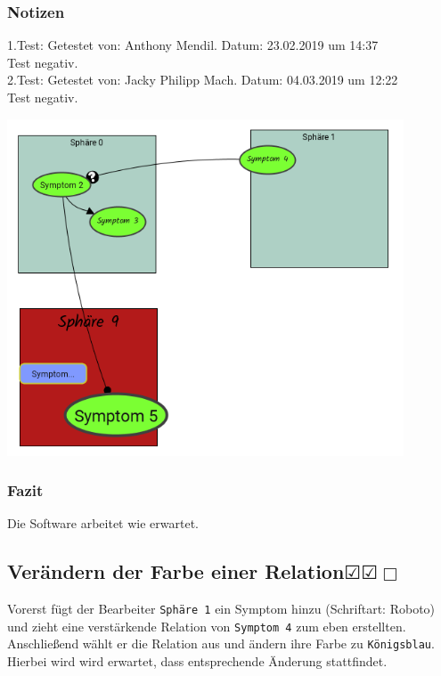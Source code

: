 \documentclass[enabledeprecatedfontcommands]{scrartcl}
\newcommand{\subsectiont}[2]{\subsection[#1]{#1{\normalsize\normalfont #2}}}
\newcommand{\leer}{$\Box$}
\newcommand{\ok}{$\CheckedBox$}
\begin{document}
\subsubsection{Notizen}
1.Test: Getestet von: Anthony Mendil. Datum: 23.02.2019 um 14:37 \\
Test negativ.\\
2.Test: Getestet von: Jacky Philipp Mach. Datum: 04.03.2019 um 12:22 \\
Test negativ.
\begin{center}
\includegraphics[height=10cm]{2_31.PNG}
\end{center}
\subsubsection{Fazit}
Die Software arbeitet wie erwartet.

\subsectiont{Verändern der Farbe einer Relation}{\dotfill\ok\ok\leer}
Vorerst fügt der Bearbeiter \texttt{Sphäre 1} ein Symptom hinzu (Schriftart: Roboto) und zieht eine verstärkende Relation von \texttt{Symptom 4} zum eben erstellten. Anschließend wählt er die Relation aus und ändern ihre Farbe zu \texttt{Königsblau}. Hierbei wird wird erwartet, dass entsprechende Änderung stattfindet. 
\end{document}
